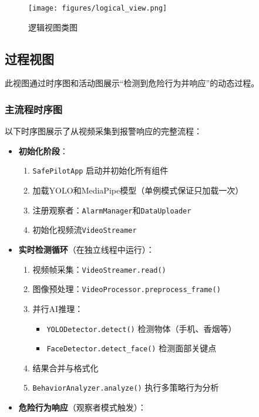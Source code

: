 \documentclass[a4paper,12pt]{article}
\begin{document}
\begin{figure}[h]
  \centering
  \texttt{[image: figures/logical\_view.png]}
  \caption{逻辑视图类图}
  \label{fig:logical_view}
\end{figure}

\subsection{过程视图}
此视图通过时序图和活动图展示“检测到危险行为并响应”的动态过程。

\subsubsection{主流程时序图}
以下时序图展示了从视频采集到报警响应的完整流程：

\begin{itemize}
  \item \textbf{初始化阶段}：
    \begin{enumerate}
      \item \texttt{SafePilotApp} 启动并初始化所有组件
      \item 加载YOLO和MediaPipe模型（单例模式保证只加载一次）
      \item 注册观察者：\texttt{AlarmManager}和\texttt{DataUploader}
      \item 初始化视频流\texttt{VideoStreamer}
    \end{enumerate}
  \item \textbf{实时检测循环}（在独立线程中运行）：
    \begin{enumerate}
      \item 视频帧采集：\texttt{VideoStreamer.read()}
      \item 图像预处理：\texttt{VideoProcessor.preprocess\_frame()}
      \item 并行AI推理：
        \begin{itemize}
          \item \texttt{YOLODetector.detect()} 检测物体（手机、香烟等）
          \item \texttt{FaceDetector.detect\_face()} 检测面部关键点
        \end{itemize}
      \item 结果合并与格式化
      \item \texttt{BehaviorAnalyzer.analyze()} 执行多策略行为分析
    \end{enumerate}
  \item \textbf{危险行为响应}（观察者模式触发）：
    \begin{enumerate}

\end{enumerate}
\end{itemize}
\end{document}
